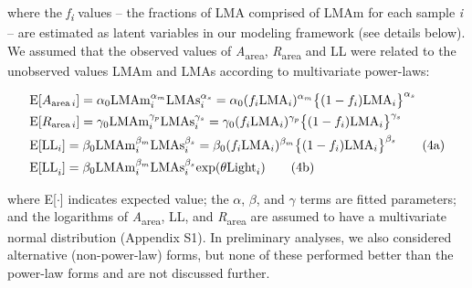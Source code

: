 \documentclass[
  12pt,
  a4paper,
,tablecaptionabove
]{scrartcl}
\begin{document}
where the \emph{f\textsubscript{i}} values -- the fractions of LMA
comprised of LMAm for each sample \emph{i} -- are estimated as latent
variables in our modeling framework (see details below). We assumed that
the observed values of \emph{A}\textsubscript{area},
\emph{R}\textsubscript{area} and LL were related to the unobserved
values LMAm and LMAs according to multivariate power-laws:

\begin{align}
& \mathrm{E}[A_{\mathrm{area} \, i}]
= \alpha_0\mathrm{LMAm}_{i}^{\alpha_m}\mathrm{LMAs}_i^{\alpha_s}  =  \alpha_0 (f_i \mathrm{LMA}_{i})^{\alpha_m} \bigl\{(1-f_i) \mathrm{LMA}_{i}\bigr\}^{\alpha_s} \label{eq:Aarea} \\
& \mathrm{E}[R_{\mathrm{area} \, i}]
= \gamma_0\mathrm{LMAm}_{i}^{\gamma_p} \mathrm{LMAs}_{i}^{\gamma_s}
= \gamma_0 (f_i \mathrm{LMA}_{i})^{\gamma_p} \bigl\{(1-f_i)\mathrm{LMA}_{i}\bigr\}^{\gamma_s} \label{eq:Rarea} \\
& \mathrm{E}[\mathrm{LL}_i] = \beta_0\mathrm{LMAm}_{i}^{\beta_m} \mathrm{LMAs}_{i}^{\beta_s}  = \beta_0 (f_i \mathrm{LMA}_{i})^{\beta_m} \bigl\{(1-f_i) \mathrm{LMA}_{i}\bigr\}^{\beta_s} \label{eq:LL_pot} \tag{4a}  \\
& \mathrm{E[LL}_i] = \beta_0\mathrm{LMAm}_{i}^{\beta_m} \mathrm{LMAs}_{i}^{\beta_s} \mathrm{exp}(\theta \mathrm{Light}_i)  \stepcounter{equation} \label{eq:LL_opt} \tag{4b}
\end{align}

where E{[}\(\cdot\){]} indicates expected value; the \(\alpha\),
\(\beta\), and \(\gamma\) terms are fitted parameters; and the
logarithms of \emph{A}\textsubscript{area}, LL, and
\emph{R}\textsubscript{area} are assumed to have a multivariate normal
distribution (Appendix S1). In preliminary analyses, we also considered
alternative (non-power-law) forms, but none of these performed better
than the power-law forms and are not discussed further.
\end{document}
